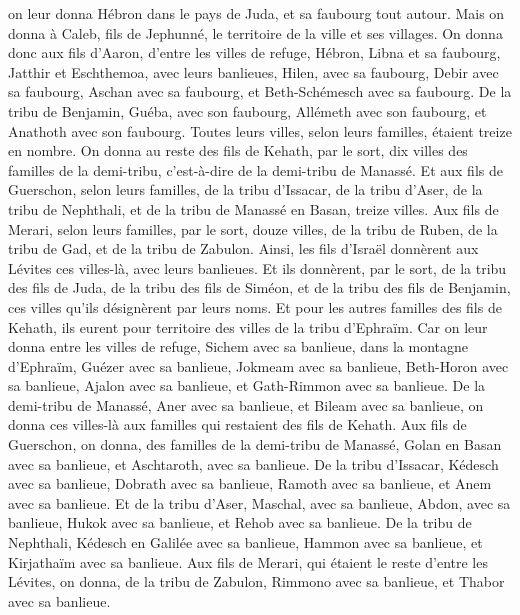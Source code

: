 \begin{multicols}{2}
on leur donna Hébron dans le pays de Juda, et sa faubourg tout autour.
Mais on donna à Caleb, fils de Jephunné, le territoire de la ville et ses villages.
On donna donc aux fils d'Aaron, d'entre les villes de refuge, Hébron, Libna et sa faubourg, Jatthir et Eschthemoa, avec leurs banlieues,
Hilen, avec sa faubourg, Debir avec sa faubourg,
Aschan avec sa faubourg, et Beth-Schémesch avec sa faubourg.
De la tribu de Benjamin, Guéba, avec son faubourg, Allémeth avec son faubourg, et Anathoth avec son faubourg. Toutes leurs villes, selon leurs familles, étaient treize en nombre.
On donna au reste des fils de Kehath, par le sort, dix villes des familles de la demi-tribu, c'est-à-dire de la demi-tribu de Manassé.
Et aux fils de Guerschon, selon leurs familles, de la tribu d'Issacar, de la tribu d'Aser, de la tribu de Nephthali, et de la tribu de Manassé en Basan, treize villes.
Aux fils de Merari, selon leurs familles, par le sort, douze villes, de la tribu de Ruben, de la tribu de Gad, et de la tribu de Zabulon.
Ainsi, les fils d’Israël donnèrent aux Lévites ces villes-là, avec leurs banlieues.
Et ils donnèrent, par le sort, de la tribu des fils de Juda, de la tribu des fils de Siméon, et de la tribu des fils de Benjamin, ces villes qu’ils désignèrent par leurs noms.
Et pour les autres familles des fils de Kehath, ils eurent pour territoire des villes de la tribu d'Ephraïm.
Car on leur donna entre les villes de refuge, Sichem avec sa banlieue, dans la montagne d'Ephraïm, Guézer avec sa banlieue,
Jokmeam avec sa banlieue, Beth-Horon avec sa banlieue,
Ajalon avec sa banlieue, et Gath-Rimmon avec sa banlieue.
De la demi-tribu de Manassé, Aner avec sa banlieue, et Bileam avec sa banlieue, on donna ces villes-là aux familles qui restaient des fils de Kehath.
Aux fils de Guerschon, on donna, des familles de la demi-tribu de Manassé, Golan en Basan avec sa banlieue, et Aschtaroth, avec sa banlieue.
De la tribu d'Issacar, Kédesch avec sa banlieue, Dobrath avec sa banlieue,
Ramoth avec sa banlieue, et Anem avec sa banlieue.
Et de la tribu d'Aser, Maschal, avec sa banlieue, Abdon, avec sa banlieue,
Hukok avec sa banlieue, et Rehob avec sa banlieue.
De la tribu de Nephthali, Kédesch en Galilée avec sa banlieue, Hammon avec sa banlieue, et Kirjathaïm avec sa banlieue.
Aux fils de Merari, qui étaient le reste d'entre les Lévites, on donna, de la tribu de Zabulon, Rimmono avec sa banlieue, et Thabor avec sa banlieue.

\end{multicols}
